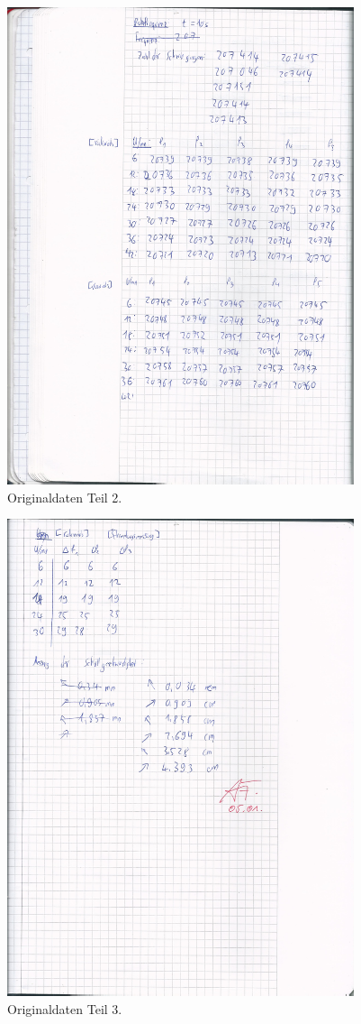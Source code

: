 \begin{figure}[H]
  \centering
  \includegraphics[height=14cm]{oringinal-2.jpg}
  \caption{Originaldaten Teil 2.}
  \label{fig:original2}
\end{figure}

\begin{figure}[H]
  \centering
  \includegraphics[height=14cm]{oringinal-3.jpg}
  \caption{Originaldaten Teil 3.}
  \label{fig:original3}
\end{figure}

